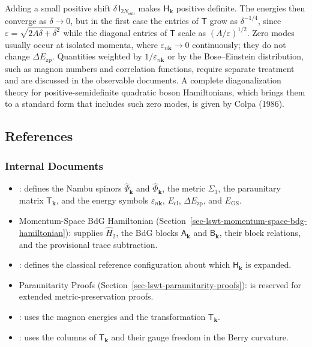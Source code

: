 Adding a small positive shift \(\delta\,\mathsf I_{2N_{\mathrm{sub}}}\) makes \(\mathsf H_{\mathbf k}\) positive definite. The energies then converge as \(\delta\to0\), but in the first case the entries of \(\mathsf T\) grow as \(\delta^{-1/4}\), since \(\varepsilon=\sqrt{2A\delta+\delta^2}\) while the diagonal entries of \(\mathsf T\) scale as \((A/\varepsilon)^{1/2}\). Zero modes usually occur at isolated momenta, where \(\varepsilon_{n\mathbf k}\to0\) continuously; they do not change \(\Delta E_{\mathrm{zp}}\). Quantities weighted by \(1/\varepsilon_{n\mathbf k}\) or by the Bose--Einstein distribution, such as magnon numbers and correlation functions, require separate treatment and are discussed in the observable documents. A complete diagonalization theory for positive-semidefinite quadratic boson Hamiltonians, which brings them to a standard form that includes such zero modes, is given by Colpa (1986).

\subsection{References}

\subsubsection{Internal Documents}

\begin{itemize}
\tightlist
\item
  : defines the Nambu spinors \(\hat\Psi_{\mathbf k}\) and \(\hat\Phi_{\mathbf k}\), the metric \(\Sigma_3\), the paraunitary matrix \(\mathsf T_{\mathbf k}\), and the energy symbols \(\varepsilon_{n\mathbf k}\), \(E_{\mathrm{cl}}\), \(\Delta E_{\mathrm{zp}}\), and \(E_{\mathrm{GS}}\).
\item
  Momentum-Space BdG Hamiltonian (Section~\ref{sec-lswt-momentum-space-bdg-hamiltonian}): supplies \(\hat H_2\), the BdG blocks \(\mathsf A_{\mathbf k}\) and \(\mathsf B_{\mathbf k}\), their block relations, and the provisional trace subtraction.
\item
  : defines the classical reference configuration about which \(\mathsf H_{\mathbf k}\) is expanded.
\item
  Paraunitarity Proofs (Section~\ref{sec-lswt-paraunitarity-proofs}): is reserved for extended metric-preservation proofs.
\item
  : uses the magnon energies and the transformation \(\mathsf T_{\mathbf k}\).
\item
  : uses the columns of \(\mathsf T_{\mathbf k}\) and their gauge freedom in the Berry curvature.
\end{itemize}

